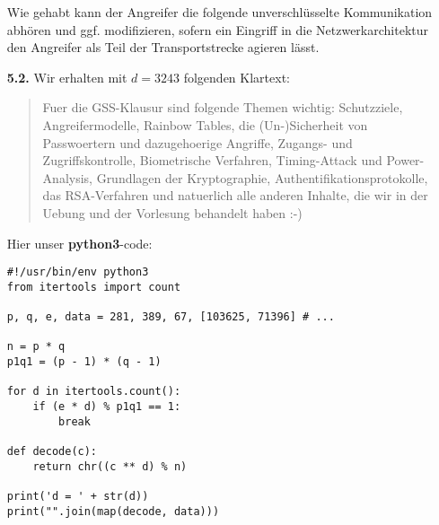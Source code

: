 \documentclass[a4paper,11pt]{article}
\begin{document}
\begin{enumerate}
    Wie gehabt kann der Angreifer die folgende unverschlüsselte Kommunikation abhören und ggf. modifizieren, sofern ein Eingriff in die Netzwerkarchitektur den Angreifer als Teil der Transportstrecke agieren lässt.

\item[\textbf{5.2.}]
    Wir erhalten mit $d=3243$ folgenden Klartext:
    \begin{quote}
        Fuer die GSS-Klausur sind folgende Themen wichtig: Schutzziele, Angreifermodelle, Rainbow Tables, die (Un-)Sicherheit von Passwoertern und dazugehoerige Angriffe, Zugangs- und Zugriffskontrolle, Biometrische Verfahren, Timing-Attack und Power-Analysis, Grundlagen der Kryptographie, Authentifikationsprotokolle, das RSA-Verfahren und natuerlich alle anderen Inhalte, die wir in der Uebung und der Vorlesung behandelt haben :-)
    \end{quote}

    Hier unser \textbf{python3}-code:\begin{verbatim}
#!/usr/bin/env python3
from itertools import count

p, q, e, data = 281, 389, 67, [103625, 71396] # ...

n = p * q
p1q1 = (p - 1) * (q - 1)

for d in itertools.count():
    if (e * d) % p1q1 == 1:
        break

def decode(c):
    return chr((c ** d) % n)

print('d = ' + str(d))
print("".join(map(decode, data)))
\end{verbatim}

\end{enumerate}
\end{document}
